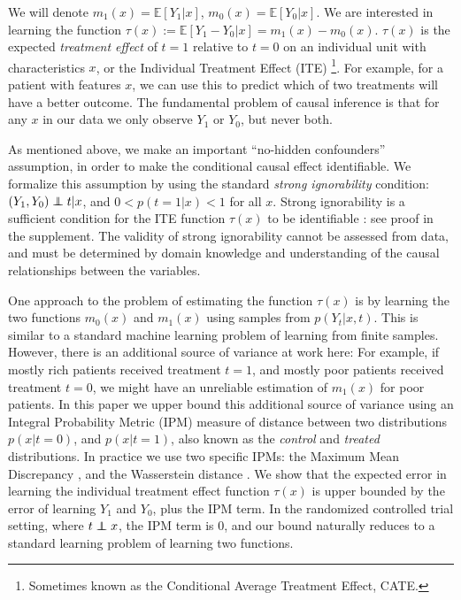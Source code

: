 \documentclass{article}
\def\E{\mathbb{E}}
\newcommand\indep{\protect\mathpalette{\protect\independenT}{\perp}}
\def\independenT#1#2{\mathrel{\rlap{$#1#2$}\mkern2mu{#1#2}}}
\begin{document}
We will denote $m_1(x) = \E\left[Y_1|x\right]$, $m_0(x) = \E\left[Y_0|x\right]$.
We are interested in learning the function $\tau(x) := \E \left[Y_1 -Y_0|x\right] = m_1(x) - m_0(x)$. $\tau(x)$ is the expected \emph{treatment effect} of $t=1$ relative to $t=0$ on an individual unit with characteristics $x$, or the Individual Treatment Effect (ITE) \footnote{Sometimes known as the Conditional Average Treatment Effect, CATE.}. For example, for a patient with features $x$, we can use this to predict which of two treatments will have a better outcome. The fundamental problem of causal inference is that for any $x$ in our data we only observe $Y_1$ or $Y_0$, but never both. 

As mentioned above, we make an important ``no-hidden confounders'' assumption, in order to make the conditional causal effect identifiable. We formalize this assumption by using the standard \emph{strong ignorability} condition: $(Y_1, Y_0)\indep t | x $, and $0<p(t=1|x)<1$ for all $x$. Strong ignorability is a sufficient condition for the ITE function $\tau(x)$ to be identifiable \cite{imbens2009recent,pearl2015detecting,rolling2014estimation}: see proof in the supplement. The validity of strong ignorability cannot be assessed from data, and must be determined by domain knowledge and understanding of the causal relationships between the variables.

One approach to the problem of estimating the function $\tau(x)$ is by learning the two functions $m_0(x)$ and $m_1(x)$ using samples from $p(Y_t|x,t)$. This is similar to a standard machine learning problem of learning from finite samples. However, there is an additional source of variance at work here: For example, if mostly rich patients received treatment $t=1$, and mostly poor patients received treatment $t=0$, we might have an unreliable estimation of $m_1(x)$ for poor patients. In this paper we upper bound this additional source of variance using an Integral Probability Metric (IPM) measure of distance between two distributions $p(x|t=0)$, and $p(x|t=1)$, also known as the \emph{control} and \emph{treated} distributions. In practice we use two specific IPMs: the Maximum Mean Discrepancy \cite{gretton2012mmd}, and the Wasserstein distance \cite{villani2008optimal,cuturi2014fast}. We show that the expected error in learning the individual treatment effect function $\tau(x)$ is upper bounded by the error of learning $Y_1$ and $Y_0$, plus the IPM term. In the randomized controlled trial setting, where $t \indep x$, the IPM term is $0$, and our bound naturally reduces to a standard learning problem of learning two functions.
\end{document}
